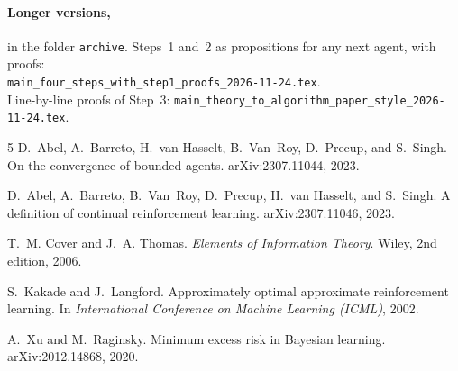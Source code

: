 \documentclass[11pt]{article}
\theoremstyle{definition}
\begin{document}
\paragraph{Longer versions,} in the folder \texttt{archive}. Steps~1 and~2 as propositions for any next agent, with proofs:\\ {\small\texttt{main\_four\_steps\_with\_step1\_proofs\_2026-11-24.tex}}.\\ Line-by-line proofs of Step~3: {\small\texttt{main\_theory\_to\_algorithm\_paper\_style\_2026-11-24.tex}}.


\begin{thebibliography}{5}
D.~Abel, A.~Barreto, H.~van Hasselt, B.~Van~Roy, D.~Precup, and S.~Singh.
\newblock On the convergence of bounded agents.
\newblock arXiv:2307.11044, 2023.

D.~Abel, A.~Barreto, B.~Van~Roy, D.~Precup, H.~van Hasselt, and S.~Singh.
\newblock A definition of continual reinforcement learning.
\newblock arXiv:2307.11046, 2023.

T.~M. Cover and J.~A. Thomas.
\newblock \emph{Elements of Information Theory}.
\newblock Wiley, 2nd edition, 2006.

S.~Kakade and J.~Langford.
\newblock Approximately optimal approximate reinforcement learning.
\newblock In \emph{International Conference on Machine Learning (ICML)}, 2002.

A.~Xu and M.~Raginsky.
\newblock Minimum excess risk in Bayesian learning.
\newblock arXiv:2012.14868, 2020.
\end{thebibliography}
\end{document}
